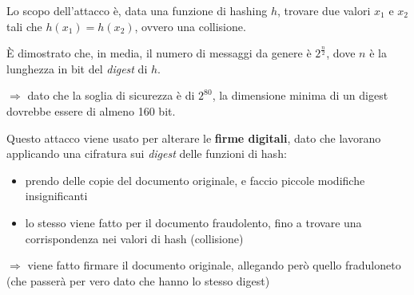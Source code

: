 \noindent Lo scopo dell'attacco è, data una funzione di hashing $h$, trovare due valori $x_1$
e $x_2$ tali che $h(x_1)=h(x_2)$, ovvero una collisione.

\noindent È dimostrato che, in media, il numero di messaggi da genere è $2^{\frac{n}{2}}$, dove $n$
è la lunghezza in bit del \textit{digest} di $h$.

$\Rightarrow$ dato che la soglia di sicurezza è di $2^{80}$, la dimensione minima di un digest 
dovrebbe essere di almeno 160 bit.

\noindent Questo attacco viene usato per alterare le \textbf{firme digitali}, dato che lavorano 
applicando una cifratura sui \textit{digest} delle funzioni di hash:
\begin{itemize}
    \item prendo delle copie del documento originale, e faccio piccole modifiche insignificanti 
    \item lo stesso viene fatto per il documento fraudolento, fino a trovare una corrispondenza nei 
    valori di hash (collisione)
\end{itemize}

$\Rightarrow$ viene fatto firmare il documento originale, allegando però quello fraduloneto (che 
passerà per vero dato che hanno lo stesso digest)



